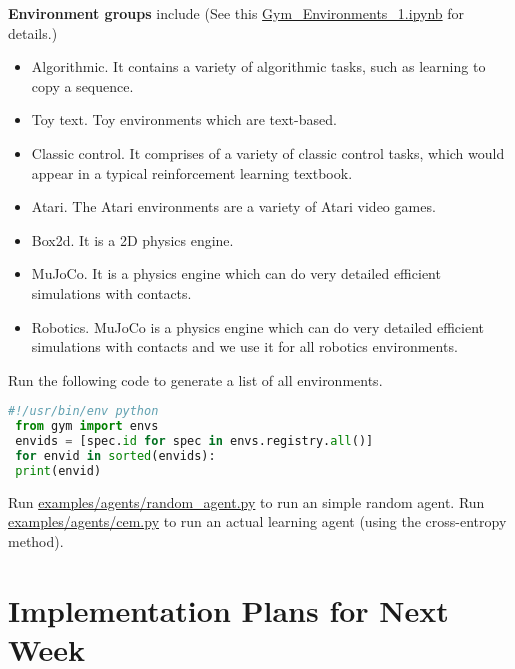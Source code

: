 \textbf{Environment groups} include (See this \href{https://colab.research.google.com/drive/1mPXv9Z3rIP3KbUzPzBRXiGtk-j3-IsmU}{Gym\_Environments\_1.ipynb} for details.)
\begin{itemize}
	\item Algorithmic. It contains a variety of algorithmic tasks, such as learning to copy a sequence.
	\item Toy text. Toy environments which are text-based.
	\item Classic control. It comprises of a variety of classic control tasks, which would appear in a typical reinforcement learning textbook.
	\item Atari. The Atari environments are a variety of Atari video games. 
	\item Box2d. It is a 2D physics engine.
	\item MuJoCo. It is a physics engine which can do very detailed efficient simulations with contacts.
	\item Robotics. MuJoCo is a physics engine which can do very detailed efficient simulations with contacts and we use it for all robotics environments. 
\end{itemize}
 
 Run the following code to generate a list of all environments.
 
 \begin{lstlisting}[language=python,caption={Python Code to generate a list of all enironments.}]
 #!/usr/bin/env python
 from gym import envs
 envids = [spec.id for spec in envs.registry.all()]
 for envid in sorted(envids):
 print(envid)
 \end{lstlisting}
 
 Run \href{https://github.com/openai/gym/blob/master/examples/agents/random_agent.py}{examples/agents/random\_agent.py} to run an simple random agent.
 Run \href{https://github.com/openai/gym/blob/master/examples/agents/cem.py}{examples/agents/cem.py} to run an actual learning agent (using the cross-entropy method).

\section{Implementation Plans for Next Week}

\href{https://github.com/dennybritz/reinforcement-learning}{}
\href{https://www.learndatasci.com/tutorials/reinforcement-q-learning-scratch-python-openai-gym/}{}
\href{https://towardsdatascience.com/reinforcement-learning-with-python-8ef0242a2fa2}{}

